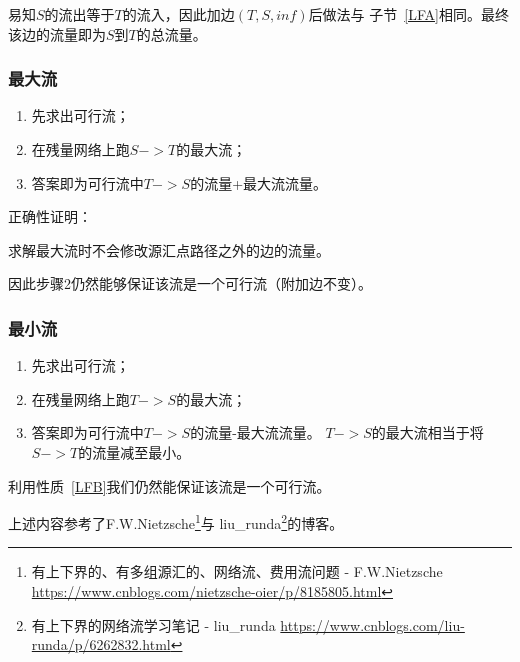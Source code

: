 易知$S$的流出等于$T$的流入，因此加边$(T,S,inf)$后做法与
子节~\ref{LFA}相同。最终该边的流量即为$S$到$T$的总流量。

\subsubsection{最大流}

\begin{enumerate}
    \item 先求出可行流；
    \item 在残量网络上跑$S->T$的最大流；
    \item 答案即为可行流中$T->S$的流量+最大流流量。
\end{enumerate}

正确性证明：

\begin{property}\label{LFB}
    求解最大流时不会修改源汇点路径之外的边的流量。
\end{property}

因此步骤2仍然能够保证该流是一个可行流（附加边不变）。

\subsubsection{最小流}

\begin{enumerate}
    \item 先求出可行流；
    \item 在残量网络上跑$T->S$的最大流；
    \item 答案即为可行流中$T->S$的流量-最大流流量。
    $T->S$的最大流相当于将$S->T$的流量减至最小。
\end{enumerate}

利用性质~\ref{LFB}我们仍然能保证该流是一个可行流。

上述内容参考了F.W.Nietzsche\footnote{有上下界的、有多组源汇的、网络流、费用流问题 - F.W.Nietzsche
\url{https://www.cnblogs.com/nietzsche-oier/p/8185805.html}}与
liu\_runda\footnote{有上下界的网络流学习笔记 - liu\_runda
\url{https://www.cnblogs.com/liu-runda/p/6262832.html}}的博客。
